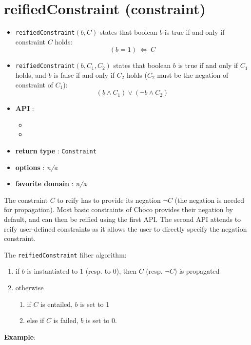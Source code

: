 \section{reifiedConstraint (constraint)}\label{reifiedconstraint:reifiedconstraintconstraint}\hypertarget{reifiedconstraint:reifiedconstraintconstraint}{}
\begin{notedef}
  \begin{itemize}
  \item \texttt{reifiedConstraint}$(b,C)$ states that boolean $b$ is true if and only if constraint $C$ holds:
  $$(b=1)\ \iff\ C$$
  \item \texttt{reifiedConstraint}$(b,C_1,C_2)$ states that boolean $b$ is true if and only if $C_1$ holds, and $b$ is false if and only if $C_2$ holds ($C_2$ must be the negation of constraint of $C_1$):
$$(b\land C_1) \lor (\neg b \land C_2)$$
  \end{itemize}
\end{notedef}

\begin{itemize}
	\item \textbf{API} :
	\begin{itemize}
		\item {}
		\item {}
	\end{itemize}
	\item \textbf{return type} : \texttt{Constraint}
	\item \textbf{options} : \emph{n/a}
	\item \textbf{favorite domain} : \emph{n/a}
\end{itemize}

The constraint $C$ to reify has to provide its negation $\neg C$ (the negation is needed for propagation). 
Most basic constraints of Choco provides their negation by default, and can then be reified using the first API.
The second API attends to reify user-defined constraints as it allows the user to directly specify the negation constraint. 

The {\tt  reifiedConstraint} filter algorithm:
\begin{enumerate}
	\item if $b$ is instantiated to 1 (resp. to 0), then $C$ (resp. $\neg C$) is propagated
	\item otherwise
	\begin{enumerate}
		\item if $C$ is entailed, $b$ is set to 1
		\item else if $C$ is failed, $b$ is set to 0.
	\end{enumerate}
\end{enumerate}


\textbf{Example}:


